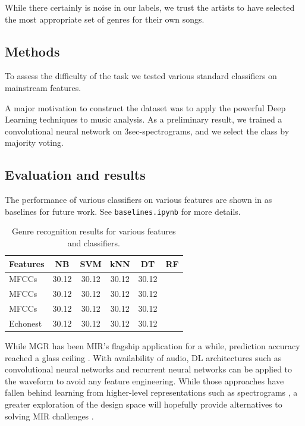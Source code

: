 \documentclass{article}
\begin{document}
While there certainly is noise in our labels, we trust the artists to have selected the most appropriate set of genres for their own songs.


\subsection{Methods}

To assess the difficulty of the task we tested various standard classifiers on mainstream features.

A major motivation to construct the dataset was to apply the powerful Deep Learning techniques to music analysis. As a preliminary result, we trained a convolutional neural network on 3sec-spectrograms, and we select the class by majority voting.

\subsection{Evaluation and results}

The performance of various classifiers on various features are shown in  as baselines for future work.
See \texttt{baselines.ipynb} for more details.


\begin{table}
	\centering
	\begin{tabular}{lccccc}
		\toprule
		Features & NB & SVM & kNN & DT & RF \\
		\midrule
		MFCCs  & 30.12 & 30.12 & 30.12 & 30.12 \\
		MFCCs  & 30.12 & 30.12 & 30.12 & 30.12 \\
		MFCCs  & 30.12 & 30.12 & 30.12 & 30.12 \\
		Echonest  & 30.12 & 30.12 & 30.12 & 30.12 \\
		\bottomrule
	\end{tabular}
	\caption{Genre recognition results for various features and classifiers.}
	\label{tab:mgr}
\end{table}

While MGR has been MIR's flagship application for a while, prediction accuracy reached a glass ceiling \cite{mgr_why}.
With availability of audio, DL architectures such as convolutional neural networks and recurrent neural networks can be applied to the waveform to avoid any feature engineering. While those approaches have fallen behind learning from higher-level representations such as spectrograms \cite{dieleman_endtoend}, a greater exploration of the design space will hopefully provide alternatives to solving MIR challenges \cite{mir_dl_feature_learning}.
\end{document}

